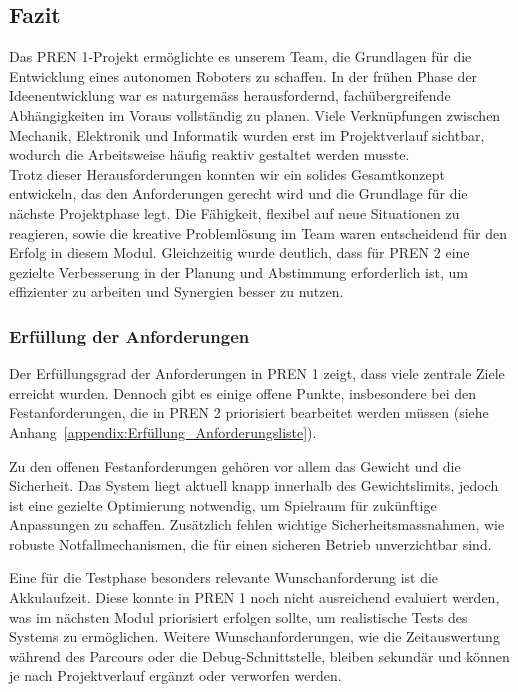 \documentclass[main.tex]{subfiles} %
\begin{document}

\subsection{Fazit}

Das PREN 1-Projekt ermöglichte es unserem Team, die Grundlagen für die  
Entwicklung eines autonomen Roboters zu schaffen. In der frühen Phase der  
Ideenentwicklung war es naturgemäss herausfordernd, fachübergreifende  
Abhängigkeiten im Voraus vollständig zu planen. Viele Verknüpfungen zwischen  
Mechanik, Elektronik und Informatik wurden erst im Projektverlauf sichtbar,  
wodurch die Arbeitsweise häufig reaktiv gestaltet werden musste.\\

Trotz dieser Herausforderungen konnten wir ein solides Gesamtkonzept entwickeln,  
das den Anforderungen gerecht wird und die Grundlage für die nächste  
Projektphase legt. Die Fähigkeit, flexibel auf neue Situationen zu reagieren,  
sowie die kreative Problemlösung im Team waren entscheidend für den Erfolg  
in diesem Modul. Gleichzeitig wurde deutlich, dass für PREN 2 eine gezielte  
Verbesserung in der Planung und Abstimmung erforderlich ist, um effizienter  
zu arbeiten und Synergien besser zu nutzen. 

\subsubsection{Erfüllung der Anforderungen}  
Der Erfüllungsgrad der Anforderungen in PREN 1 zeigt, dass viele zentrale Ziele  
erreicht wurden. Dennoch gibt es einige offene Punkte, insbesondere bei den  
Festanforderungen, die in PREN 2 priorisiert bearbeitet werden müssen 
(siehe Anhang~\ref{appendix:Erfüllung_Anforderungsliste}).

Zu den offenen Festanforderungen gehören vor allem das Gewicht und die Sicherheit.  
Das System liegt aktuell knapp innerhalb des Gewichtslimits, jedoch ist eine gezielte  
Optimierung notwendig, um Spielraum für zukünftige Anpassungen zu schaffen.  
Zusätzlich fehlen wichtige Sicherheitsmassnahmen, wie robuste Notfallmechanismen,  
die für einen sicheren Betrieb unverzichtbar sind.

Eine für die Testphase besonders relevante Wunschanforderung ist die Akkulaufzeit.  
Diese konnte in PREN 1 noch nicht ausreichend evaluiert werden, was im nächsten  
Modul priorisiert erfolgen sollte, um realistische Tests des Systems zu ermöglichen.  
Weitere Wunschanforderungen, wie die Zeitauswertung während des Parcours oder  
die Debug-Schnittstelle, bleiben sekundär und können je nach Projektverlauf  
ergänzt oder verworfen werden.
\end{document}
